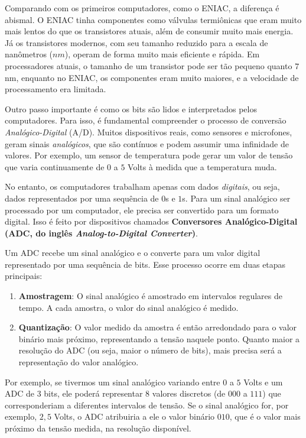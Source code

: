 Comparando com os primeiros computadores, como o ENIAC, a diferença é abismal. O ENIAC tinha componentes como válvulas termiônicas que eram muito mais lentos do que os transistores atuais, além de consumir muito mais energia. Já os transistores modernos, com seu tamanho reduzido para a escala de nanômetros (\(nm\)), operam de forma muito mais eficiente e rápida. Em processadores atuais, o tamanho de um transistor pode ser tão pequeno quanto \(7\) nm, enquanto no ENIAC, os componentes eram muito maiores, e a velocidade de processamento era limitada.


Outro passo importante é como os bits são lidos e interpretados pelos computadores. Para isso, é fundamental compreender o processo de conversão \textit{Analógico-Digital} (A/D). Muitos dispositivos reais, como sensores e microfones, geram sinais \textit{analógicos}, que são contínuos e podem assumir uma infinidade de valores. Por exemplo, um sensor de temperatura pode gerar um valor de tensão que varia continuamente de $0$ a $5$ Volts à medida que a temperatura muda.

No entanto, os computadores trabalham apenas com dados \textit{digitais}, ou seja, dados representados por uma sequência de $0$s e $1$s. Para um sinal analógico ser processado por um computador, ele precisa ser convertido para um formato digital. Isso é feito por dispositivos chamados \textbf{Conversores Analógico-Digital (ADC, do inglês \textit{Analog-to-Digital Converter})}.

Um ADC recebe um sinal analógico e o converte para um valor digital representado por uma sequência de bits. Esse processo ocorre em duas etapas principais:
\begin{enumerate}
    \item \textbf{Amostragem}: O sinal analógico é amostrado em intervalos regulares de tempo. A cada amostra, o valor do sinal analógico é medido.
    \item \textbf{Quantização}: O valor medido da amostra é então arredondado para o valor binário mais próximo, representando a tensão naquele ponto. Quanto maior a resolução do ADC (ou seja, maior o número de bits), mais precisa será a representação do valor analógico.
\end{enumerate}

Por exemplo, se tivermos um sinal analógico variando entre $0$ a $5$ Volts e um ADC de 3 bits, ele poderá representar $8$ valores discretos (de $000$ a $111$) que corresponderiam a diferentes intervalos de tensão. Se o sinal analógico for, por exemplo, $2,5$ Volts, o ADC atribuiria a ele o valor binário $010$, que é o valor mais próximo da tensão medida, na resolução disponível.

